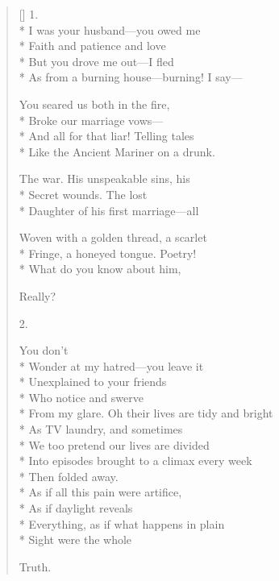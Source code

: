 \label{ch:sheer_poetry}
\settowidth{\versewidth}{                 Unnecessary to say what they meant---}
\begin{verse}[\versewidth]
1.\\*
I was your husband---you owed me\\*
Faith and patience and love\\*
But you drove me out---I fled\\*
As from a burning house---burning! I say---

You seared us both in the fire,\\*
Broke our marriage vows---\\*
And all for that liar! Telling tales\\*
Like the Ancient Mariner on a drunk.

The war. His unspeakable sins, his\\*
Secret wounds. The lost \\*
Daughter of his first marriage---all

Woven with a golden thread, a scarlet\\*
Fringe, a honeyed tongue. Poetry!\\*
What do you know about him,

Really?

2.

You don't\\*
Wonder at my hatred---you leave it\\*
Unexplained to your friends\\*
Who notice and swerve\\*
From my glare.  Oh their lives are tidy and bright\\*
As TV laundry, and sometimes\\*
We too pretend our lives are divided\\*
Into episodes brought to a climax every week\\*
Then folded away.\\*
As if all this pain were artifice, \\*
As if daylight reveals\\*
Everything, as if what happens in plain \\*
Sight were the whole

Truth.


\end{verse}

